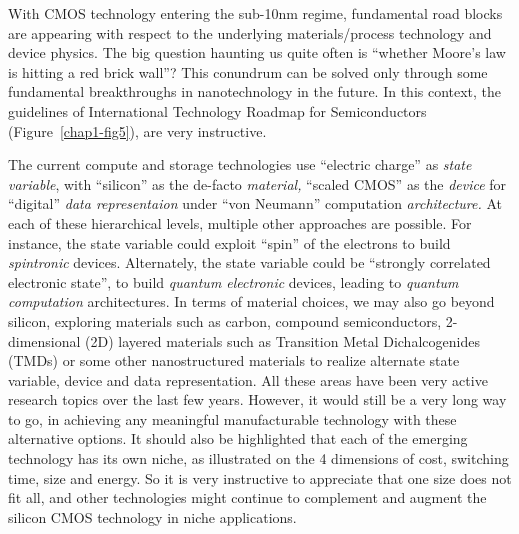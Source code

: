 \begin{multicols}{2}
With CMOS technology entering the sub-10nm regime, fundamental road blocks are appearing with respect to the underlying materials/process technology and device physics.  The big question haunting us quite often is “whether Moore’s law is hitting a red brick wall”? This conundrum can be solved only through some fundamental breakthroughs in nanotechnology in the future. In this context, the guidelines of International Technology Roadmap for Semiconductors (Figure~\ref{chap1-fig5}), are very instructive. 

The current compute and storage technologies use “electric charge” as \textit{state variable}, with “silicon” as the de-facto \textit{material,} “scaled CMOS” as the \textit{device} for “digital” \textit{data representaion} under “von Neumann” computation \textit{architecture.}  At each of these hierarchical levels, multiple other approaches are possible. For instance, the state variable could exploit “spin” of the electrons to build \textit{spintronic} devices. Alternately, the state variable could be “strongly correlated electronic state”, to build \textit{quantum electronic} devices, leading to \textit{quantum computation} architectures. In terms of material choices, we may also go beyond silicon, exploring materials such as carbon, compound semiconductors, 2-dimensional (2D) layered materials such as Transition Metal Dichalcogenides (TMDs) or some other nanostructured materials to realize alternate state variable, device and data representation. All these areas have been  very active research topics over the last few years. However, it would still be a very long way to go, in achieving any meaningful manufacturable technology with these alternative options. It should also be highlighted that each of the emerging technology has its own niche, as illustrated on the 4 dimensions of cost, switching time, size and energy. So it is very instructive to appreciate that one size does not fit all, and other technologies might continue to complement and augment the silicon CMOS technology in niche applications.


\end{multicols}
